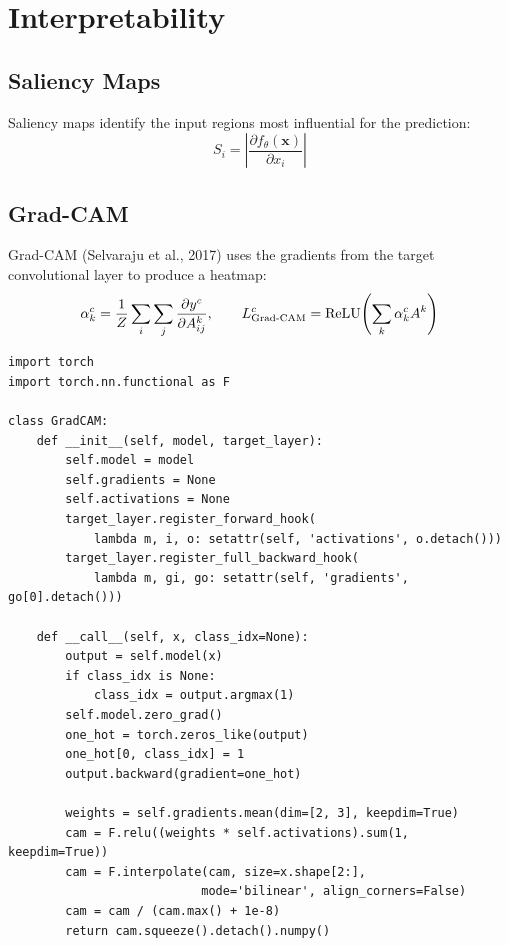 \section{Interpretability}
\label{sec:interpretability}

\subsection{Saliency Maps}

Saliency maps identify the input regions most influential for the prediction:
\[
S_i = \left|\frac{\partial f_\theta(\bm{x})}{\partial x_i}\right|
\]

\subsection{Grad-CAM}

Grad-CAM (Selvaraju et al., 2017) uses the gradients from the target convolutional layer to produce a heatmap:
\[
\alpha_k^c = \frac{1}{Z}\sum_i \sum_j \frac{\partial y^c}{\partial A^k_{ij}}, \qquad L_{\mathrm{Grad\text{-}CAM}}^c = \mathrm{ReLU}\!\left(\sum_k \alpha_k^c A^k\right)
\]

\begin{codeblock}[title=\textbf{Grad-CAM in PyTorch}]
\begin{verbatim}
import torch
import torch.nn.functional as F

class GradCAM:
    def __init__(self, model, target_layer):
        self.model = model
        self.gradients = None
        self.activations = None
        target_layer.register_forward_hook(
            lambda m, i, o: setattr(self, 'activations', o.detach()))
        target_layer.register_full_backward_hook(
            lambda m, gi, go: setattr(self, 'gradients', go[0].detach()))

    def __call__(self, x, class_idx=None):
        output = self.model(x)
        if class_idx is None:
            class_idx = output.argmax(1)
        self.model.zero_grad()
        one_hot = torch.zeros_like(output)
        one_hot[0, class_idx] = 1
        output.backward(gradient=one_hot)

        weights = self.gradients.mean(dim=[2, 3], keepdim=True)
        cam = F.relu((weights * self.activations).sum(1, keepdim=True))
        cam = F.interpolate(cam, size=x.shape[2:],
                           mode='bilinear', align_corners=False)
        cam = cam / (cam.max() + 1e-8)
        return cam.squeeze().detach().numpy()
\end{verbatim}
\end{codeblock}

